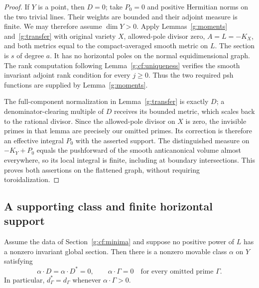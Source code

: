 \begin{proof}
If $Y$ is a point, then $D=0$; take $P_0=0$ and positive Hermitian
norms on the two trivial lines. Their weights are bounded and their
adjoint measure is finite. We may therefore assume $\dim Y>0$.
Apply Lemmas~\ref{g:moments} and~\ref{g:transfer} with original
variety $X$, allowed-pole divisor zero, $A=L=-K_X$, and both metrics equal
to the compact-averaged smooth metric on $L$. The section is $s$ of degree
$a$. It has no horizontal poles on the normal equidimensional graph.
The rank computation following Lemma~\ref{g:cf:uniqueness} verifies the
smooth invariant adjoint rank condition for every $j\geq0$. Thus the
two required psh functions are supplied by Lemma~\ref{g:moments}.

The full-component normalization in Lemma~\ref{g:transfer} is exactly
$D$; a denominator-clearing multiple of $D$ receives its bounded metric,
which scales back to the rational divisor. Since the allowed-pole divisor
on $X$ is zero, the invisible primes in that lemma are precisely our
omitted primes. Its correction is therefore an effective integral $P_0$
with the asserted support. The distinguished measure on $-K_Y+P_0$
equals the pushforward of the smooth anticanonical volume almost
everywhere, so its local integral is finite, including at boundary
intersections. This proves both assertions on the flattened graph,
without requiring toroidalization.
\end{proof}

\subsection{A supporting class and finite horizontal support}

\begin{lemma}\label{g:cf:supporting-class}
Assume the data of Section~\ref{g:cf:minima} and suppose no positive power of \(L\) has a nonzero
invariant global section. Then there is a nonzero movable class \(\alpha\)
on \(Y\) satisfying
\[
 \alpha\cdot D=\alpha\cdot D^*=0,
 \qquad \alpha\cdot\Gamma=0
             \quad\text{for every omitted prime }\Gamma.
\]
In particular, \(d^*_\Gamma=d_\Gamma\) whenever
\(\alpha\cdot\Gamma>0\).
\end{lemma}


